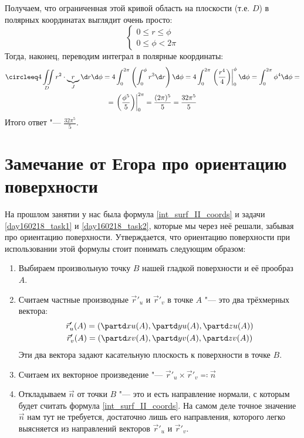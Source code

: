 	Получаем, что ограниченная этой кривой область на плоскости (т.е. $D$) в полярных координатах выглядит очень просто:
	\[
		\begin{cases}
			0 \le r \le \phi \\
			0 \le \phi < 2\pi
		\end{cases}
	\]
	Тогда, наконец, переводим интеграл в полярные координаты:
	\begin{gather*}
		\circleeq 4\iint\limits_D r^2 \cdot \underbrace{r}_{J} \d r \d \phi =
		4 \int_{0}^{2\pi} \left( \int_{0}^{\phi} r^3 \d r \right) \d \phi =
		4 \int_0^{2\pi} \left.\left( \frac{r^4}{4} \right)\right|_0^{\phi} \d \phi =
		\int_0^{2\pi} \phi^4 \d \phi = \\
		= \left.\left(\frac{\phi^5}{5}\right)\right|_0^{2\pi} =
		\frac{(2\pi)^5}{5} =
		\frac{32\pi^5}{5}
	\end{gather*}
	Итого ответ "--- $\frac{32\pi^5}{5}$.

\section{Замечание от Егора про ориентацию поверхности}
	На прошлом занятии у нас была формула \ref{int_surf_II_coords} и задачи \ref{day160218_task1} и \ref{day160218_task2},
	которые мы через неё решали, забывая про ориентацию поверхности.
	Утверждается, что ориентацию поверхности при использовании этой формулы стоит понимать следующим образом:
	\begin{enumerate}
		\item
			Выбираем произвольную точку $B$ нашей гладкой поверхности и её прообраз $A$.
		\item
			Считаем частные производные $\vec r'_u$ и $\vec r'_v$ в точке $A$ "--- это два трёхмерных вектора:
			\begin{gather*}
				\vec r'_u(A) = \left(\partd xu(A), \partd yu(A), \partd zu(A)\right) \\
				\vec r'_v(A) = \left(\partd xv(A), \partd yv(A), \partd zv(A)\right)
			\end{gather*}
			Эти два вектора задают касательную плоскость к поверхности в точке $B$.
		\item
			Считаем их векторное произведение "--- $\vec r'_u \times \vec r'_v \eqcolon \vec n$
		\item
			Откладываем $\vec n$ от точки $B$ "--- это и есть направление нормали, с которым
			будет считать формула \ref{int_surf_II_coords}.
			На самом деле точное значение $\vec n$ нам тут не требуется, достаточно лишь его направления,
			которого легко выясняется из направлений векторов $\vec r'_u$ и $\vec r'_v$.
	\end{enumerate}

